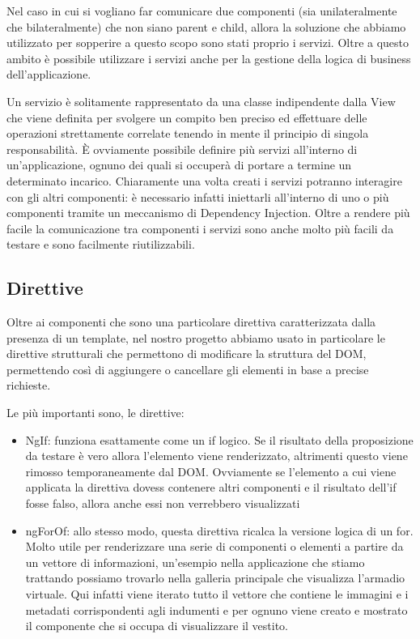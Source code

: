 Nel caso in cui si vogliano far comunicare due componenti (sia unilateralmente che bilateralmente) che non siano parent e child, allora la soluzione che abbiamo utilizzato per sopperire a questo scopo sono stati proprio i servizi. Oltre a questo ambito è possibile utilizzare i servizi anche per la gestione della logica di business dell'applicazione.

Un servizio è solitamente rappresentato da una classe indipendente dalla View che viene definita per svolgere un compito ben preciso ed effettuare delle operazioni strettamente correlate tenendo in mente il principio di singola responsabilità. È ovviamente possibile definire più servizi all'interno di un'applicazione, ognuno dei quali si occuperà di portare a termine un determinato incarico. Chiaramente una volta creati i servizi potranno interagire con gli altri componenti: è necessario infatti iniettarli all'interno di uno o più componenti tramite un meccanismo di Dependency Injection.
Oltre a rendere più facile la comunicazione tra componenti i servizi sono anche molto più facili da testare e sono facilmente riutilizzabili.

\subsection{Direttive}

Oltre ai componenti che sono una particolare direttiva caratterizzata dalla presenza di un template, nel nostro progetto abbiamo usato in particolare le direttive strutturali che permettono di modificare la struttura del DOM, permettendo così di aggiungere o cancellare gli elementi in base a precise richieste.

Le più importanti sono, le direttive:
\begin{itemize}
\item NgIf: funziona esattamente come un if logico. Se il risultato della proposizione da testare è vero allora l'elemento viene renderizzato, altrimenti questo viene rimosso temporaneamente dal DOM. Ovviamente se l'elemento a cui viene applicata la direttiva dovess contenere altri componenti e il risultato dell'if fosse falso, allora anche essi non verrebbero visualizzati
\item ngForOf: allo stesso modo, questa direttiva ricalca la versione logica di un for. Molto utile per renderizzare una serie di componenti o elementi a partire da un vettore di informazioni, un'esempio nella applicazione che stiamo trattando possiamo trovarlo nella galleria principale che visualizza l'armadio virtuale. Qui infatti viene iterato tutto il vettore che contiene le immagini e i metadati corrispondenti agli indumenti e per ognuno viene creato e mostrato il componente che si occupa di visualizzare il vestito.
\end{itemize}

